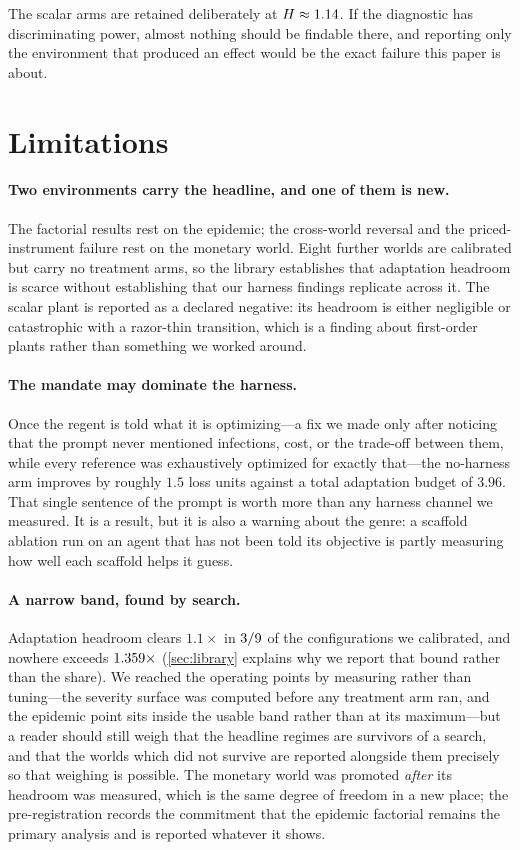 \documentclass[11pt]{article}
\begin{document}
The scalar arms are retained deliberately at $H \approx 1.14$. If the diagnostic has
discriminating power, almost nothing should be findable there, and reporting only the environment
that produced an effect would be the exact failure this paper is about.

\section{Limitations}
\label{sec:limitations}

\paragraph{Two environments carry the headline, and one of them is new.} The factorial results
rest on the epidemic; the cross-world reversal and the priced-instrument failure rest on the monetary
world. Eight further worlds are calibrated but carry no treatment arms, so the library establishes
that adaptation headroom is scarce without establishing that our harness findings replicate across
it. The scalar plant is reported as a declared negative: its headroom is either negligible or
catastrophic with a razor-thin transition, which is a finding about first-order plants rather than
something we worked around.

\paragraph{The mandate may dominate the harness.} Once the regent is told what it is optimizing---a
fix we made only after noticing that the prompt never mentioned infections, cost, or the trade-off
between them, while every reference was exhaustively optimized for exactly that---the no-harness arm
improves by roughly $1.5$ loss units against a total adaptation budget of $3.96$. That single
sentence of the prompt is worth more than any harness channel we measured. It is a result, but it is
also a warning about the genre: a scaffold ablation run on an agent that has not been told its
objective is partly measuring how well each scaffold helps it guess.

\paragraph{A narrow band, found by search.} Adaptation headroom clears $1.1\times$ in
$3/9$ of the configurations we calibrated, and nowhere exceeds $1.359\times$
(\cref{sec:library} explains why we report that bound rather than the share). We reached the
operating points by
measuring rather than tuning---the severity surface was computed before any treatment arm ran, and
the epidemic point sits inside the usable band rather than at its maximum---but a reader should still
weigh that the headline regimes are survivors of a search, and that the worlds which did not survive
are reported alongside them precisely so that weighing is possible. The monetary world was promoted
\emph{after} its headroom was measured, which is the same degree of freedom in a new place; the
pre-registration records the commitment that the epidemic factorial remains the primary analysis and
is reported whatever it shows.
\end{document}
